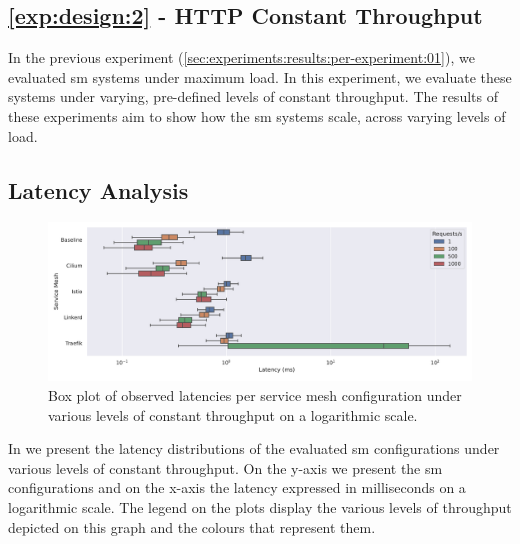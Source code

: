 \subsection{\ref{exp:design:2} - HTTP Constant Throughput}
\label{sec:experiments:results:per-experiment:02}

In the previous experiment (\cref{sec:experiments:results:per-experiment:01}), we evaluated \gls{sm} systems under maximum load. In this experiment, we evaluate these systems under varying, pre-defined levels of constant throughput. The results of these experiments aim to show how the \gls{sm} systems scale, across varying levels of load.

\subsection{Latency Analysis}
\label{sec:experiments:results:per-experiment:02:latency}

\begin{figure}[!t]
    \centering
    
    \includegraphics[width=1\linewidth]{5_experimental_evaluation/figures/exp-02-latency-log.pdf}
    
    \caption[Box plot of observed latencies under various levels of constant throughput]{Box plot of observed latencies per service mesh configuration under various levels of constant throughput on a logarithmic scale.}
    
    \label{fig:exp:02:latency-distributions}
\end{figure}


In \label{fig:exp:02:latency-distributions} we present the latency distributions of the evaluated \gls{sm} configurations under various levels of constant throughput.  On the y-axis we present the \gls{sm} configurations and on the x-axis the latency expressed in milliseconds on a logarithmic scale. The legend on the plots display the various levels of throughput depicted on this graph and the colours that represent them.

